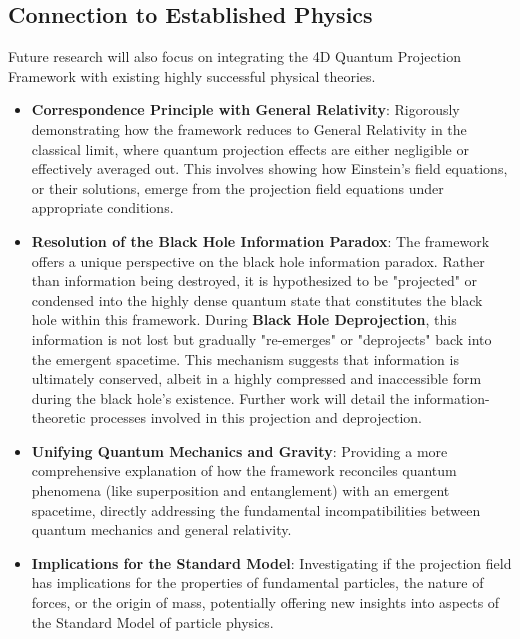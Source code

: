 \documentclass[12pt,a4paper]{article}
\numberwithin{equation}{section}
\begin{document}
\subsection{Connection to Established Physics}
Future research will also focus on integrating the 4D Quantum Projection Framework with existing highly successful physical theories.
\begin{itemize}
    \item \textbf{Correspondence Principle with General Relativity}: Rigorously demonstrating how the framework reduces to General Relativity in the classical limit, where quantum projection effects are either negligible or effectively averaged out. This involves showing how Einstein's field equations, or their solutions, emerge from the projection field equations under appropriate conditions.
    \item \textbf{Resolution of the Black Hole Information Paradox}: The framework offers a unique perspective on the black hole information paradox. Rather than information being destroyed, it is hypothesized to be "projected" or condensed into the highly dense quantum state that constitutes the black hole within this framework. During \textbf{Black Hole Deprojection}, this information is not lost but gradually "re-emerges" or "deprojects" back into the emergent spacetime. This mechanism suggests that information is ultimately conserved, albeit in a highly compressed and inaccessible form during the black hole's existence. Further work will detail the information-theoretic processes involved in this projection and deprojection.
    \item \textbf{Unifying Quantum Mechanics and Gravity}: Providing a more comprehensive explanation of how the framework reconciles quantum phenomena (like superposition and entanglement) with an emergent spacetime, directly addressing the fundamental incompatibilities between quantum mechanics and general relativity.
    \item \textbf{Implications for the Standard Model}: Investigating if the projection field has implications for the properties of fundamental particles, the nature of forces, or the origin of mass, potentially offering new insights into aspects of the Standard Model of particle physics.
\end{itemize}
\end{document}
